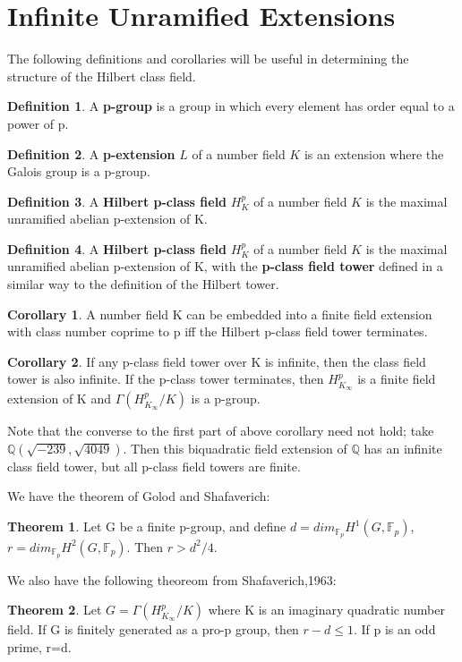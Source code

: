 \documentclass[12pt]{extarticle}
\newcommand{\<}{\langle}
\renewcommand{\>}{\rangle}
\theoremstyle{definition}
\newtheorem{theorem}{Theorem}
\newtheorem{corollary}{Corollary}
\newtheorem*{definition}{Definition}
\begin{document}
\section{Infinite Unramified Extensions}
The following definitions and corollaries will be useful in determining the structure of the Hilbert class field. 
\begin{definition}
A \textbf{p-group} is a group in which every element has order equal to a power of p.
\end{definition}
\begin{definition}
A \textbf{p-extension} $L$ of a number field $K$ is an extension where the Galois group is a p-group.
\end{definition}
\begin{definition}
A \textbf{Hilbert p-class field} $H_K^{p}$ of a number field $K$ is the maximal unramified abelian p-extension of K.
\end{definition}
\begin{definition}
A \textbf{Hilbert p-class field} $H_K^{p}$ of a number field $K$ is the maximal unramified abelian p-extension of K, with the \textbf{p-class field tower} defined in a similar way to the definition of the Hilbert tower. 
\end{definition}
\begin{corollary}
 A number field K can be embedded into a finite field extension with class number coprime to p iff the Hilbert p-class field tower terminates.
\end{corollary}
\begin{corollary}
If any p-class field tower over K is infinite, then the class field tower is also infinite. If the p-class tower terminates, then $H_{K_\infty}^{p}$ is a finite field extension of K and $\Gamma(H_{K_\infty}^{p}/K)$ is a p-group.
\end{corollary}
Note that the converse to the first part of above corollary need not hold; take $\mathbb{Q}\left(\sqrt{-239},\sqrt{4049}\right)$. Then this biquadratic field extension of $\mathbb{Q}$ has an infinite class field tower, but all p-class field towers are finite. 
\par
We have the theorem of Golod and Shafaverich:\begin{theorem}
    Let G be a finite p-group, and define $d=dim_{\mathbb{F}_{p}}H^1(G,\mathbb{F}_p)$, $r=dim_{\mathbb{F}_{p}}H^2(G,\mathbb{F}_p)$. 
    Then $r>d^2/4$.
\end{theorem}
We also have the following theoreom from Shafaverich,1963:\begin{theorem}
    Let $G = \Gamma(H_{K_{\infty}}^{p}/K)$ where K is an imaginary quadratic number field. If G is finitely generated as a pro-p group, then
$r-d\leq 1 $. If p is an odd prime, r=d.
\end{theorem}
\end{document}
